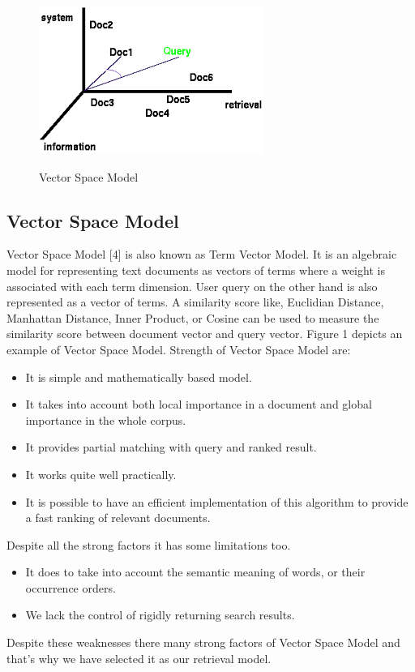 \begin{figure}
\center
\includegraphics[width=0.5\linewidth]{figures/vsm}
\label{fig:vsm}
\caption{Vector Space Model}
\end{figure}

\subsection{Vector Space Model}
\label{sec:vsm-desc}
Vector Space Model [4] is also known as Term Vector Model. It is an algebraic model for
representing text documents as vectors of terms where a weight is associated with each term
dimension. User query on the other hand is also represented as a vector of terms. A similarity
score like, Euclidian Distance, Manhattan Distance, Inner Product, or Cosine can be used to
measure the similarity score between document vector and query vector. Figure 1 depicts an
example of Vector Space Model. Strength of Vector Space Model are:

\begin{itemize}
\item It is simple and mathematically based model.
\item It takes into account both local importance in a document and global importance in the whole corpus.
\item It provides partial matching with query and ranked result.
\item It works quite well practically.
\item It is possible to have an efficient implementation of this algorithm to provide a fast ranking of relevant documents.
\end{itemize}
Despite all the strong factors it has some limitations too.
\begin{itemize}
\item It does to take into account the
semantic meaning of words, or their occurrence orders.
\item We lack the control of rigidly returning search results.
\end{itemize}
Despite these weaknesses there many strong factors of Vector Space Model and that’s why we have selected it as our retrieval model.
